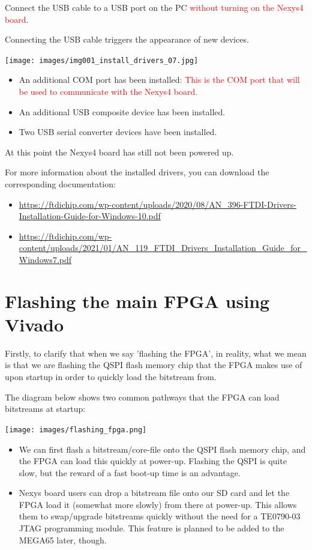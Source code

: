 Connect the USB cable to a USB port on the PC \textcolor{red}{without turning on the Nexys4 board}.

Connecting the USB cable triggers the appearance of new devices.

\texttt{[image: images/img001\_install\_drivers\_07.jpg]}

\begin{itemize}
  \item An additional COM port has been installed: \textcolor{red}{This is the COM port that will be used to communicate with the Nexys4 board.}
  \item An additional USB composite device has been installed.
  \item Two USB serial converter devices have been installed.
\end{itemize}

At this point the Nexys4 board has still not been powered up.

For more information about the installed drivers, you can download the corresponding documentation:

\begin{itemize}
  \item \url{https://ftdichip.com/wp-content/uploads/2020/08/AN\_396-FTDI-Drivers-Installation-Guide-for-Windows-10.pdf}
  \item \url{https://ftdichip.com/wp-content/uploads/2021/01/AN\_119\_FTDI\_Drivers\_Installation\_Guide\_for\_Windows7.pdf}
\end{itemize}

\section{Flashing the main FPGA using Vivado}
\label{sec:mainfpgaflashing}

Firstly, to clarify that when we say 'flashing the FPGA', in reality, what we mean is that we are flashing the QSPI flash memory chip that the FPGA makes use of upon startup in order to quickly load the bitstream from.

The diagram below shows two common pathways that the FPGA can load bitstreams at startup:

\begin{center}
\texttt{[image: images/flashing\_fpga.png]}
\end{center}

\begin{itemize}
  \item We can first flash a bitstream/core-file onto the QSPI flash memory chip, and the FPGA can load this quickly at power-up. Flashing the QSPI is quite slow, but the reward of a fast boot-up time is an advantage.
  \item Nexys board users can drop a bitstream file onto our SD card and let the FPGA load it (somewhat more slowly) from there at power-up. This allows them to swap/upgrade bitstreams quickly without the need for a TE0790-03 JTAG programming module. This feature is planned to be added to the MEGA65 later, though.
\end{itemize}

